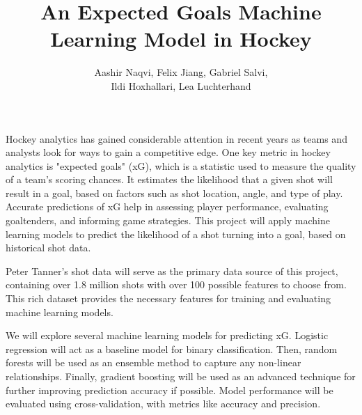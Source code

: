 \documentclass[12pt]{article}
\title{An Expected Goals Machine Learning Model in Hockey}
\author{Aashir Naqvi, Felix Jiang, Gabriel Salvi, \\ Ildi Hoxhallari, Lea Luchterhand}
\begin{document}
\maketitle

Hockey analytics has gained considerable attention in recent years as teams and analysts look for ways to gain a competitive edge. One key metric in hockey analytics is "expected goals" (xG), which is a statistic used to measure the quality of a team's scoring chances. It estimates the likelihood that a given shot will result in a goal, based on factors such as shot location, angle, and type of play. Accurate predictions of xG help in assessing player performance, evaluating goaltenders, and informing game strategies. This project will apply machine learning models to predict the likelihood of a shot turning into a goal, based on historical shot data.
\\
\par
Peter Tanner's shot data will serve as the primary data source of this project, containing over 1.8 million shots with over 100 possible features to choose from. This rich dataset provides the necessary features for training and evaluating machine learning models.
\\
\par
We will explore several machine learning models for predicting xG. Logistic regression will act as a baseline model for binary classification. Then, random forests will be used as an ensemble method to capture any non-linear relationships. Finally, gradient boosting will be used as an advanced technique for further improving prediction accuracy if possible.
Model performance will be evaluated using cross-validation, with metrics like accuracy and precision.
\end{document}
